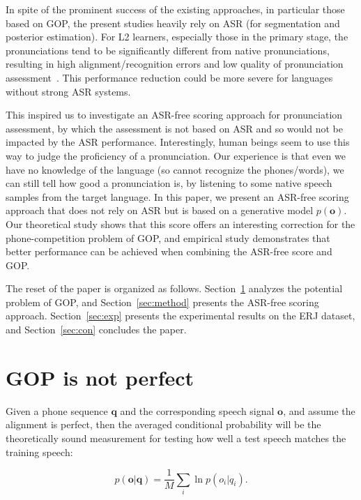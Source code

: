 \documentclass[a4paper]{article}
\begin{document}
In spite of the prominent success of the existing approaches, in particular those based on GOP, the present studies heavily rely on
ASR (for segmentation and posterior estimation). For L2 learners, especially those in the primary stage,
the pronunciations tend to be significantly different from native pronunciations, resulting in high alignment/recognition errors and low quality of
pronunciation assessment~\cite{Knill2018}. This performance reduction could be more severe for languages without strong ASR systems.

This inspired us to investigate an ASR-free scoring approach for pronunciation assessment, by which the assessment is not based on ASR and
so would not be impacted by the ASR performance.
Interestingly, human beings seem to use this way to judge the proficiency of a pronunciation.
Our experience is that even we have no knowledge of the language (so cannot recognize the phones/words),
we can still tell how good a pronunciation is, by listening to some native speech samples from the target language.
In this paper, we present an ASR-free scoring approach that does not rely on ASR but is based on a generative model $p(\mathbf{o})$.
Our theoretical study shows that this score offers an interesting correction for the phone-competition problem of GOP,
and empirical study demonstrates that better performance can be achieved when combining the ASR-free score and GOP.

The reset of the paper is organized as follows. Section~\ref{sec:gop} analyzes the potential problem of GOP,
and Section~\ref{sec:method} presents the ASR-free scoring approach.
Section~\ref{sec:exp} presents the experimental results on the ERJ dataset,
and Section~\ref{sec:con} concludes the paper.


\section{GOP is not perfect}
\label{sec:gop}

Given a phone sequence $\mathbf{q}$ and the corresponding speech signal $\mathbf{o}$, and assume the alignment is perfect, then the averaged conditional probability
will be the theoretically sound measurement for testing how well a test speech matches the training speech:

\begin{equation}
p(\mathbf{o}|\mathbf{q}) = \frac{1}{M} \sum_i \ln p(o_i|q_i).
\label{eq:conditional}
\end{equation}
\end{document}
